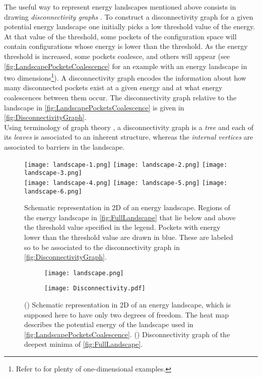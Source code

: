 The useful way to represent energy landscapes mentioned above consists in drawing \emph{disconnectivity graphs} \cite{becker1997topology}. 
To construct a disconnectivity graph for a given potential energy landscape one initially picks a low threshold value of the energy. At that value of the threshold, some pockets of the configuration space will contain configurations whose energy is lower than the threshold. As the energy threshold is increased, some pockets coalesce, and others will appear (see \autoref{fig:LandscapePocketsCoalescence} for an example with an energy landscape in two dimensions\footnote{Refer to \cite{becker1997topology} for plenty of one-dimensional examples.}). A disconnectivity graph encodes the information about how many disconnected pockets exist at a given energy and at what energy coalescences between them occur. The disconnectivity graph relative to the landscape in \autoref{fig:LandscapePocketsCoalescence} is given in \autoref{fig:DisconnectivityGraph}.\\
Using terminology of graph theory \cite{bollobas1998modern}, a disconnectivity graph is a \emph{tree} and each of its \emph{leaves} is associated to an inherent structure, whereas the \emph{internal vertices} are associated to barriers in the landscape.
\begin{figure} 
\centering 
\texttt{[image: landscape-1.png]} 
\texttt{[image: landscape-2.png]} 
\texttt{[image: landscape-3.png]} \\
\texttt{[image: landscape-4.png]} 
\texttt{[image: landscape-5.png]} 
\texttt{[image: landscape-6.png]} 
\caption{Schematic representation in 2D of an energy landscape. Regions of the energy landscape in \autoref{fig:FullLandscape} that lie below and above the threshold value specified in the legend. Pockets with energy lower than the threshold value are drawn in blue. These are labeled so to be associated to the disconnectivity graph in \autoref{fig:DisconnectivityGraph}. \label{fig:LandscapePocketsCoalescence}}
\end{figure}
\begin{figure} 
\centering
\begin{subfigure}[b]{0.55\textwidth}
	\centering
	\texttt{[image: landscape.png]}
	\caption{\label{fig:FullLandscape}}
\end{subfigure}
\centering
\begin{subfigure}[b]{0.4\textwidth}
	\centering
	\texttt{[image: Disconnectivity.pdf]} 
	\caption{\label{fig:DisconnectivityGraph}}
\end{subfigure} 
\caption{() Schematic representation in 2D of an energy landscape, which is supposed here to have only two degrees of freedom. The heat map describes the potential energy of the landscape used in \autoref{fig:LandscapePocketsCoalescence}. () Disconnectivity graph of the deepest minima of \autoref{fig:FullLandscape}.}
\end{figure}
